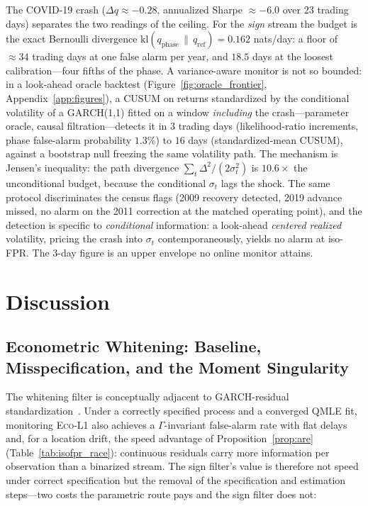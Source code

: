 \documentclass[sigconf,anonymous,review]{acmart}
\theoremstyle{acmdefinition}
\begin{document}
The COVID-19 crash ($\Delta q \approx -0.28$, annualized Sharpe ${\approx}{-6.0}$ over $23$ trading days) separates the two readings of the ceiling. For the \emph{sign} stream the budget is the exact Bernoulli divergence $\mathrm{kl}(q_{\mathrm{phase}}\,\|\,q_{\mathrm{ref}}) = 0.162$ nats/day: a floor of ${\approx}34$ trading days at one false alarm per year, and $18.5$ days at the loosest calibration---four fifths of the phase. A variance-aware monitor is not so bounded: in a look-ahead oracle backtest (Figure~\ref{fig:oracle_frontier}, Appendix~\ref{app:figures}), a CUSUM on returns standardized by the conditional volatility of a GARCH(1,1) fitted on a window \emph{including} the crash---parameter oracle, causal filtration---detects it in $3$ trading days (likelihood-ratio increments, phase false-alarm probability $1.3\%$) to $16$ days (standardized-mean CUSUM), against a bootstrap null freezing the same volatility path. The mechanism is Jensen's inequality: the path divergence $\sum_t \Delta^2/(2\sigma_t^2)$ is $10.6\times$ the unconditional budget, because the conditional $\sigma_t$ lags the shock. The same protocol discriminates the census flags (2009 recovery detected, 2019 advance missed, no alarm on the 2011 correction at the matched operating point), and the detection is specific to \emph{conditional} information: a look-ahead \emph{centered realized} volatility, pricing the crash into $\sigma_t$ contemporaneously, yields no alarm at iso-FPR. The $3$-day figure is an upper envelope no online monitor attains.

\section{Discussion}\label{sec:discussion}

\subsection{Econometric Whitening: Baseline, Misspecification, and the Moment Singularity}

The whitening filter is conceptually adjacent to GARCH-residual standardization~\cite{horvath_2006, song_kang_2020}. Under a correctly specified process and a converged QMLE fit, monitoring \textsc{Eco-L1} also achieves a $\Gamma$-invariant false-alarm rate with flat delays and, for a location drift, the speed advantage of Proposition~\ref{prop:are} (Table~\ref{tab:isofpr_race}): continuous residuals carry more information per observation than a binarized stream. The sign filter's value is therefore not speed under correct specification but the removal of the specification and estimation steps---two costs the parametric route pays and the sign filter does not:
\end{document}
